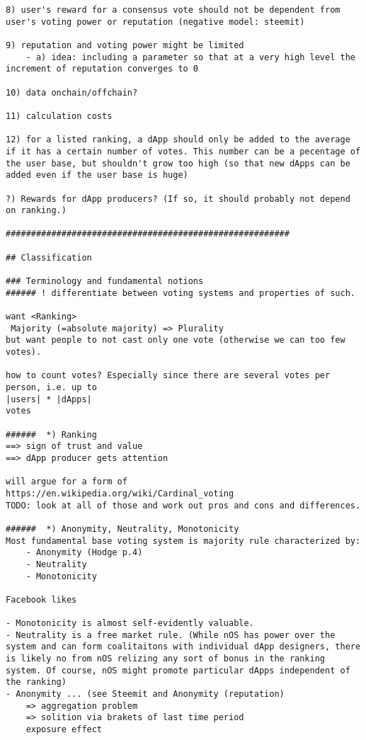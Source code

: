 {{\begin{verbatim}
8) user's reward for a consensus vote should not be dependent from user's voting power or reputation (negative model: steemit)

9) reputation and voting power might be limited 
    - a) idea: including a parameter so that at a very high level the increment of reputation converges to 0 

10) data onchain/offchain? 

11) calculation costs

12) for a listed ranking, a dApp should only be added to the average if it has a certain number of votes. This number can be a pecentage of the user base, but shouldn't grow too high (so that new dApps can be added even if the user base is huge)
 
?) Rewards for dApp producers? (If so, it should probably not depend on ranking.)

########################################################

## Classification

### Terminology and fundamental notions 
###### ! differentiate between voting systems and properties of such.
	
want <Ranking>
 Majority (=absolute majority) => Plurality
but want people to not cast only one vote (otherwise we can too few votes).

how to count votes? Especially since there are several votes per person, i.e. up to
|users| * |dApps|
votes

######  *) Ranking
==> sign of trust and value
==> dApp producer gets attention

will argue for a form of
https://en.wikipedia.org/wiki/Cardinal_voting
TODO: look at all of those and work out pros and cons and differences.

######  *) Anonymity, Neutrality, Monotonicity
Most fundamental base voting system is majority rule characterized by: 
	- Anonymity (Hodge p.4)
	- Neutrality
	- Monotonicity
	
Facebook likes

- Monotonicity is almost self-evidently valuable. 
- Neutrality is a free market rule. (While nOS has power over the system and can form coalitaitons with individual dApp designers, there is likely no from nOS relizing any sort of bonus in the ranking system. Of course, nOS might promote particular dApps independent of the ranking) 
- Anonymity ... (see Steemit and Anonymity (reputation)
	=> aggregation problem
	=> solition via brakets of last time period
	exposure effect
	

\end{verbatim}}}
